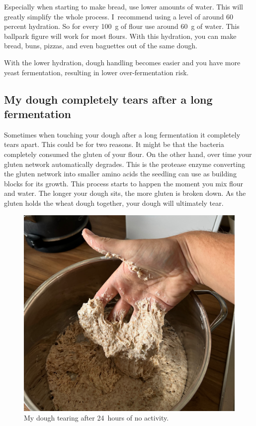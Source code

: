 Especially when starting to make bread, use lower amounts of water. This will
greatly simplify the whole process. I~recommend using a level of around 60
percent hydration. So for every \qty{100}{\gram} of flour use around \qty{60}{\gram} of water.
This ballpark figure will work for most flours. With this hydration, you can
make bread, buns, pizzas, and even baguettes out of the same dough.

With the lower hydration, dough handling becomes easier and you have more yeast
fermentation, resulting in lower over-fermentation risk.

\subsection{My dough completely tears after a long fermentation}

Sometimes when touching your dough after a long fermentation
it completely tears apart. This could be for two reasons. It might
be that the bacteria completely consumed the gluten of your flour.
On the other hand, over time your gluten network automatically
degrades. This is the protease enzyme converting the gluten
network into smaller amino acids the seedling can use as
building blocks for its growth. This process starts to happen
the moment you mix flour and water. The longer your dough sits,
the more gluten is broken down. As the gluten holds the
wheat dough together, your dough will ultimately tear.

\begin{figure}[!htb]
  \includegraphics[width=1.0\textwidth]{tearing-dough}
  \caption[Dough tearing]{My dough tearing after 24~hours of no activity.}%
  \label{fig:tearing-dough}
\end{figure}

